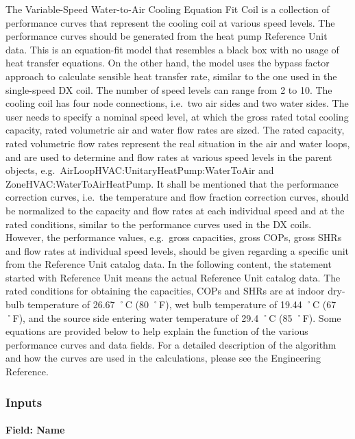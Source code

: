 The Variable-Speed Water-to-Air Cooling Equation Fit Coil is a collection of performance curves that represent the cooling coil at various speed levels. The performance curves should be generated from the heat pump Reference Unit data. This is an equation-fit model that resembles a black box with no usage of heat transfer equations. On the other hand, the model uses the bypass factor approach to calculate sensible heat transfer rate, similar to the one used in the single-speed DX coil. The number of speed levels can range from 2 to 10. The cooling coil has four node connections, i.e.~two air sides and two water sides. The user needs to specify a nominal speed level, at which the gross rated total cooling capacity, rated volumetric air and water flow rates are sized. The rated capacity, rated volumetric flow rates represent the real situation in the air and water loops, and are used to determine and flow rates at various speed levels in the parent objects, e.g.~AirLoopHVAC:UnitaryHeatPump:WaterToAir and ZoneHVAC:WaterToAirHeatPump. It shall be mentioned that the performance correction curves, i.e.~the temperature and flow fraction correction curves, should be normalized to the capacity and flow rates at each individual speed and at the rated conditions, similar to the performance curves used in the DX coils. However, the performance values, e.g.~gross capacities, gross COPs, gross SHRs and flow rates at individual speed levels, should be given regarding a specific unit from the Reference Unit catalog data. In the following content, the statement started with Reference Unit means the actual Reference Unit catalog data. The rated conditions for obtaining the capacities, COPs and SHRs are at indoor dry-bulb temperature of 26.67 ˚C (80 ˚F), wet bulb temperature of 19.44 ˚C (67 ˚F), and the source side entering water temperature of 29.4 ˚C (85 ˚F). Some equations are provided below to help explain the function of the various performance curves and data fields. For a detailed description of the algorithm and how the curves are used in the calculations, please see the Engineering Reference.

\subsubsection{Inputs}\label{inputs-31}

\paragraph{Field: Name}\label{field-name-30}

